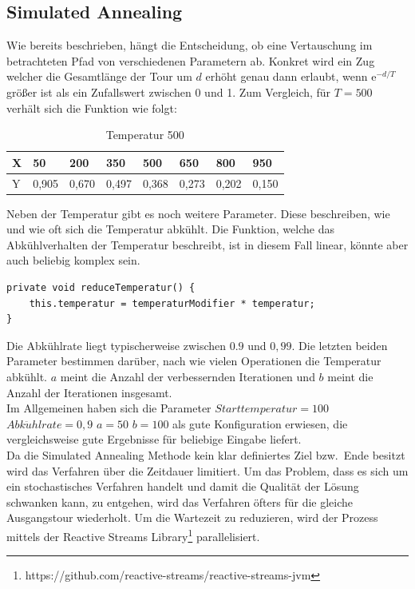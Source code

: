 \subsection{Simulated Annealing}\label{subsec:simulated-annealing-implementation}
Wie bereits beschrieben, hängt die Entscheidung, ob eine Vertauschung im betrachteten Pfad von verschiedenen Parametern ab.
Konkret wird ein Zug welcher die Gesamtlänge der Tour um $d$ erhöht genau dann erlaubt,
wenn $\mathrm{e}^{-d/T}$ grö{\ss}er ist als ein Zufallswert zwischen 0 und 1.
Zum Vergleich, für $T=500$ verhält sich die Funktion wie folgt:
\begin{table}[h]
    \centering
    \begin{tabular}{|l|l|l|l|l|l|l|l|}
        \hline
        X & 50    & 200   & 350   & 500   & 650   & 800   & 950   \\ \hline
        Y & 0,905 & 0,670 & 0,497 & 0,368 & 0,273 & 0,202 & 0,150 \\ \hline
    \end{tabular}
    \caption{Temperatur 500}
    \label{tab:simulated-annealing}
\end{table}
Neben der Temperatur gibt es noch weitere Parameter.
Diese beschreiben, wie und wie oft sich die Temperatur abkühlt.
Die Funktion, welche das Abkühlverhalten der Temperatur beschreibt, ist in diesem Fall linear, könnte aber auch beliebig komplex sein.
\begin{lstlisting}[label={lst:reduce-temperatur}]
private void reduceTemperatur() {
    this.temperatur = temperaturModifier * temperatur;
}
\end{lstlisting}
Die Abkühlrate liegt typischerweise zwischen $0.9$ und $0,99$.
Die letzten beiden Parameter bestimmen darüber, nach wie vielen Operationen die Temperatur abkühlt.
$a$ meint die Anzahl der verbessernden Iterationen und $b$ meint die Anzahl der Iterationen insgesamt.\\
Im Allgemeinen haben sich die Parameter $Starttemperatur = 100$ $Abk\ddot uhlrate = 0,9$ $a = 50$ $b = 100$ als gute
Konfiguration erwiesen, die vergleichsweise gute Ergebnisse für beliebige Eingabe liefert. \\
Da die Simulated Annealing Methode kein klar definiertes Ziel bzw.\ Ende besitzt wird das Verfahren über die Zeitdauer limitiert.
Um das Problem, dass es sich um ein stochastisches Verfahren handelt und damit die Qualität der Lösung schwanken kann,
zu entgehen, wird das Verfahren öfters für die gleiche Ausgangstour wiederholt.
Um die Wartezeit zu reduzieren, wird der Prozess mittels der Reactive Streams
Library\footnote{https://github.com/reactive-streams/reactive-streams-jvm} parallelisiert. \\

